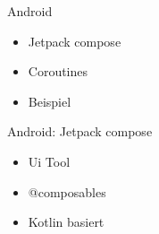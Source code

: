 \documentclass{beamer}
\begin{document}
\begin{frame}[fragile]{Android}
  \begin{itemize}
  
    \item Jetpack compose
    \item Coroutines
    \item Beispiel
  \end{itemize}
  
      \end{frame}

\begin{frame}[fragile]{Android: Jetpack compose}
  \begin{itemize}
  \item Ui Tool
  \item @composables
  \item Kotlin basiert
  \end{itemize}
\end{frame}
\end{document}
